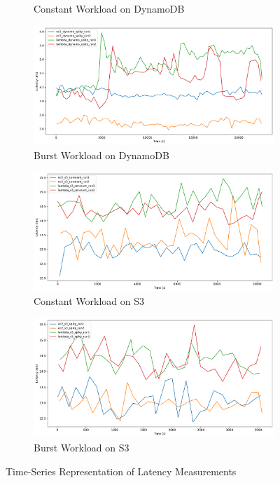 \begin{figure}[h]
\begin{subfigure}{0.49\linewidth}
		\caption{Constant Workload on DynamoDB}
		\label{fig:ts_ddb_const}
	\end{subfigure}
	\hfill
	\begin{subfigure}{0.49\linewidth}
		\centering
		\includegraphics[width=\linewidth]{./fig/ts-dynamo-bursty.pdf}
		\caption{Burst Workload on DynamoDB}
		\label{fig:ts_ddb_bursty}
	\end{subfigure}
	\vfill
	\begin{subfigure}{0.49\linewidth}
		\centering
		\includegraphics[width=\linewidth]{./fig/ts-s3-constant.pdf}
		\caption{Constant Workload on S3}
		\label{fig:ts_s3_const}
	\end{subfigure}
	\hfill
	\begin{subfigure}{0.49\linewidth}
		\centering
		\includegraphics[width=\linewidth]{./fig/ts-s3-bursty.pdf}
		\caption{Burst Workload on S3}
		\label{fig:ts_s3_bursty}
	\end{subfigure}
	\caption{Time-Series Representation of Latency Measurements}
	\label{fig:ts-plots}
\end{figure}

